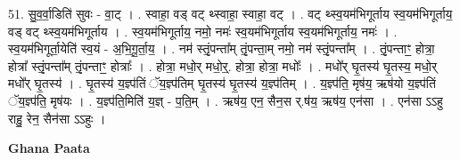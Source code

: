 \documentclass[17pt]{extarticle}
\begin{document}
51. सु॒व॒र्वा॒डिति॑ सुवः - वा॒ट् । . स्वाहा॒ वड् वट् थ्स्वाहा॒ स्वाहा॒ वट् । . वट् थ्स्व॒यम॑भिगूर्ताय स्व॒यम॑भिगूर्ताय॒ वड् वट् थ्स्व॒यम॑भिगूर्ताय । . स्व॒यम॑भिगूर्ताय॒ नमो॒ नमः॑ स्व॒यम॑भिगूर्ताय स्व॒यम॑भिगूर्ताय॒ नमः॑ । . स्व॒यम॑भिगूर्ता॒येति॑ स्व॒यं - अ॒भि॒गू॒र्ता॒य॒ । . नम॑ स्तृं॒पन्ता᳚म् तृं॒पन्ता॒म् नमो॒ नम॑ स्तृं॒पन्ता᳚म् । . तृं॒पन्ताꣳ॒॒ होत्रा॒ होत्रा᳚ स्तृं॒पन्ता᳚म् तृं॒पन्ताꣳ॒॒ होत्राः᳚ । . होत्रा॒ मधो॒र् मधो॒र्॒. होत्रा॒ होत्रा॒ मधोः᳚ । . मधो᳚र् घृ॒तस्य॑ घृ॒तस्य॒ मधो॒र् मधो᳚र् घृ॒तस्य॑ । . घृ॒तस्य॑ य॒ज्ञ्प॑तिं ॅय॒ज्ञ्प॑तिम् घृ॒तस्य॑ घृ॒तस्य॑ य॒ज्ञ्प॑तिम् । . य॒ज्ञ्प॑ति॒ मृष॑य॒ ऋष॑यो य॒ज्ञ्प॑तिं ॅय॒ज्ञ्प॑ति॒ मृष॑यः । . य॒ज्ञ्प॑ति॒मिति॑ य॒ज्ञ् - प॒ति॒म् । . ऋष॑य॒ एन॒ सैन॒स र्.ष॑य॒ ऋष॑य॒ एन॑सा । . एन॑सा ऽऽहु राहु॒ रेन॒ सैन॑सा ऽऽहुः । \newline

\textbf{Ghana Paata } \newline
\end{document}
